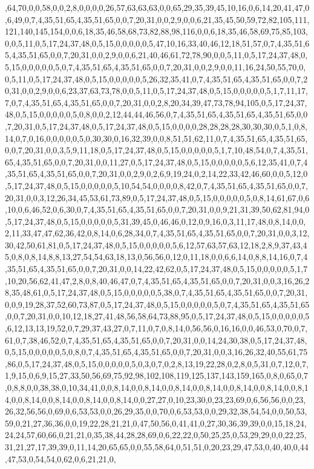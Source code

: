 {{{{{{{,64,70,0,0,58,0,0,2,8,0,0,0,0,26,57,63,63,63,0,0,65,29,35,39,45,10,16,0,6,14,20,41,47,0,6,49,0,7,4,35,51,65,4,35,51,65,0,0,7,20,31,0,0,2,9,0,0,6,21,35,45,50,59,72,82,105,111,121,140,145,154,0,0,6,18,35,46,58,68,73,82,88,98,116,0,0,6,18,35,46,58,69,75,85,103,0,0,5,11,0,5,17,24,37,48,0,5,15,0,0,0,0,0,5,47,10,16,33,40,46,12,18,51,57,0,7,4,35,51,65,4,35,51,65,0,0,7,20,31,0,0,2,9,0,0,6,21,40,46,61,72,78,90,0,0,5,11,0,5,17,24,37,48,0,5,15,0,0,0,0,0,5,0,7,4,35,51,65,4,35,51,65,0,0,7,20,31,0,0,2,9,0,0,11,16,24,50,55,70,0,0,5,11,0,5,17,24,37,48,0,5,15,0,0,0,0,0,5,26,32,35,41,0,7,4,35,51,65,4,35,51,65,0,0,7,20,31,0,0,2,9,0,0,6,23,37,63,73,78,0,0,5,11,0,5,17,24,37,48,0,5,15,0,0,0,0,0,5,1,7,11,17,7,0,7,4,35,51,65,4,35,51,65,0,0,7,20,31,0,0,2,8,20,34,39,47,73,78,94,105,0,5,17,24,37,48,0,5,15,0,0,0,0,0,5,0,8,0,0,2,12,44,44,46,56,0,7,4,35,51,65,4,35,51,65,4,35,51,65,0,0,7,20,31,0,5,17,24,37,48,0,5,17,24,37,48,0,5,15,0,0,0,0,28,28,28,28,30,30,30,0,5,1,0,8,14,0,7,0,16,0,0,0,0,0,5,0,30,30,0,16,32,39,0,0,8,51,51,62,11,0,7,4,35,51,65,4,35,51,65,0,0,7,20,31,0,0,3,5,9,11,18,0,5,17,24,37,48,0,5,15,0,0,0,0,0,5,1,7,10,48,54,0,7,4,35,51,65,4,35,51,65,0,0,7,20,31,0,0,11,27,0,5,17,24,37,48,0,5,15,0,0,0,0,0,5,6,12,35,41,0,7,4,35,51,65,4,35,51,65,0,0,7,20,31,0,0,2,9,0,2,6,9,19,24,0,2,14,22,33,42,46,60,0,0,5,12,0,5,17,24,37,48,0,5,15,0,0,0,0,0,5,10,54,54,0,0,0,0,8,42,0,7,4,35,51,65,4,35,51,65,0,0,7,20,31,0,0,3,12,26,34,45,53,61,73,89,0,5,17,24,37,48,0,5,15,0,0,0,0,0,5,0,8,14,61,67,0,6,10,0,6,46,52,0,6,30,0,7,4,35,51,65,4,35,51,65,0,0,7,20,31,0,0,9,21,31,39,50,62,81,94,0,5,17,24,37,48,0,5,15,0,0,0,0,0,5,31,39,45,0,46,46,0,12,0,9,16,0,3,11,17,48,0,8,14,0,0,2,11,33,47,47,62,36,42,0,8,14,0,6,28,34,0,7,4,35,51,65,4,35,51,65,0,0,7,20,31,0,0,3,12,30,42,50,61,81,0,5,17,24,37,48,0,5,15,0,0,0,0,0,5,6,12,57,63,57,63,12,18,2,8,9,37,43,45,0,8,0,8,14,8,8,13,27,54,54,63,18,13,0,56,56,0,12,0,11,18,0,0,6,6,14,0,8,8,14,16,0,7,4,35,51,65,4,35,51,65,0,0,7,20,31,0,0,14,22,42,62,0,5,17,24,37,48,0,5,15,0,0,0,0,0,5,1,7,10,20,56,62,41,47,2,8,0,8,40,46,47,0,7,4,35,51,65,4,35,51,65,0,0,7,20,31,0,0,3,16,26,28,35,48,61,0,5,17,24,37,48,0,5,15,0,0,0,0,0,5,38,0,7,4,35,51,65,4,35,51,65,0,0,7,20,31,0,0,9,19,28,37,52,60,73,87,0,5,17,24,37,48,0,5,15,0,0,0,0,0,5,0,7,4,35,51,65,4,35,51,65,0,0,7,20,31,0,0,10,12,18,27,41,48,56,58,64,73,88,95,0,5,17,24,37,48,0,5,15,0,0,0,0,0,5,6,12,13,13,19,52,0,7,29,37,43,27,0,7,11,0,7,0,8,14,0,56,56,0,16,16,0,0,46,53,0,70,0,7,61,0,7,38,46,52,0,7,4,35,51,65,4,35,51,65,0,0,7,20,31,0,0,14,24,30,38,0,5,17,24,37,48,0,5,15,0,0,0,0,0,5,0,8,0,7,4,35,51,65,4,35,51,65,0,0,7,20,31,0,0,3,16,26,32,40,55,61,75,86,0,5,17,24,37,48,0,5,15,0,0,0,0,0,5,0,3,0,7,0,2,8,13,19,22,28,0,2,8,0,5,31,0,7,12,0,7,1,9,15,0,6,9,15,27,33,50,56,69,75,92,98,102,108,119,125,137,143,159,165,0,8,0,65,0,7,0,8,8,0,0,38,38,0,10,34,41,0,0,8,14,0,0,8,14,0,0,8,14,0,0,8,14,0,0,8,14,0,0,8,14,0,0,8,14,0,0,8,14,0,0,8,14,0,0,8,14,0,0,8,14,0,0,27,27,0,10,23,30,0,23,23,69,0,6,56,56,0,0,23,26,32,56,56,0,69,0,6,53,53,0,0,26,29,35,0,0,70,0,6,53,53,0,0,29,32,38,54,54,0,0,50,53,59,0,21,27,36,36,0,0,19,22,28,21,21,0,47,50,56,0,41,41,0,27,30,36,39,39,0,0,15,18,24,24,24,57,60,66,0,21,21,0,35,38,44,28,28,69,0,6,22,22,0,50,25,25,0,53,29,29,0,0,22,25,31,21,27,17,39,39,0,11,14,20,65,65,0,0,55,58,64,0,51,51,0,20,23,29,47,53,0,40,40,0,44,47,53,0,54,54,0,62,0,6,21,21,0,}}}}}}}
